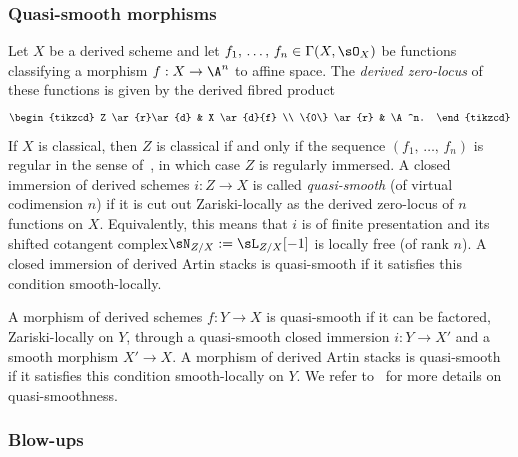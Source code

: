 \subsubsection{Quasi-smooth morphisms}
Let $X$ be a derived scheme and let $f_1,\,\ldots,\,f_n \in \Gamma(X, \sO_X)$ be functions classifying a morphism $f : X \to \A^n$ to affine space. The \emph{derived zero-locus} of these functions is given by the derived fibred product
\begin{equation}\label{eq:quasi-smooth}
\begin{tikzcd}
Z \ar{r}\ar{d} & X \ar{d}{f}
\\
\{0\} \ar{r} & \A^n.
\end{tikzcd}
\end{equation}
If $X$ is classical, then $Z$ is classical if and only if the sequence $(f_1,\,\ldots,\,f_n)$ is regular in the sense of~\cite{SGA6}, in which case $Z$ is regularly immersed. A closed immersion of derived schemes $i : Z \to X$ is called \emph{quasi-smooth} (of virtual codimension $n$) if it is cut out Zariski-locally as the derived zero-locus of $n$ functions on $X$. Equivalently, this means that $i$ is of finite presentation and its shifted cotangent complex\linebreak$\sN_{Z/X}:= \sL_{Z/X}[-1]$ is locally free (of rank $n$). A closed immersion of derived Artin stacks is quasi-smooth if it satisfies this condition smooth-locally.

A morphism of derived schemes $f : Y \to X$ is quasi-smooth if it can be factored, Zariski-locally on $Y$, through a quasi-smooth closed immersion $i : Y \to X'$ and a smooth morphism $X' \to X$. A morphism of derived Artin stacks is quasi-smooth if it satisfies this condition smooth-locally on $Y$. We refer to~\cite{KhanBlowup} for more details on quasi-smoothness.

\subsubsection{Blow-ups}

